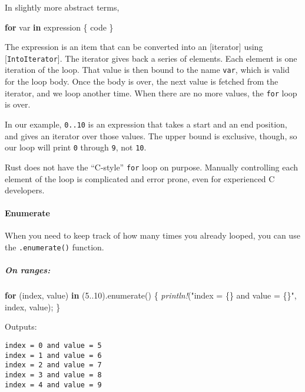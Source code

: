 \documentclass[a4paper,]{book}
\newenvironment{Shaded}{\begin{snugshade}}{\end{snugshade}}
\newcommand{\KeywordTok}[1]{\textcolor[rgb]{0.13,0.29,0.53}{\textbf{{#1}}}}
\newcommand{\DecValTok}[1]{\textcolor[rgb]{0.00,0.00,0.81}{{#1}}}
\newcommand{\StringTok}[1]{\textcolor[rgb]{0.31,0.60,0.02}{{#1}}}
\newcommand{\PreprocessorTok}[1]{\textcolor[rgb]{0.56,0.35,0.01}{\textit{{#1}}}}
\newcommand{\NormalTok}[1]{{#1}}
\let\oldparagraph\paragraph
\renewcommand{\paragraph}[1]{\oldparagraph{#1}\mbox{}}
\let\oldsubparagraph\subparagraph
\renewcommand{\subparagraph}[1]{\oldsubparagraph{#1}\mbox{}}
\begin{document}
In slightly more abstract terms,

\begin{Shaded}
\begin{Highlighting}[]
\KeywordTok{for} \NormalTok{var }\KeywordTok{in} \NormalTok{expression \{}
    \NormalTok{code}
\NormalTok{\}}
\end{Highlighting}
\end{Shaded}

The expression is an item that can be converted into an {[}iterator{]}
using {[}\texttt{IntoIterator}{]}. The iterator gives back a series of
elements. Each element is one iteration of the loop. That value is then
bound to the name \texttt{var}, which is valid for the loop body. Once
the body is over, the next value is fetched from the iterator, and we
loop another time. When there are no more values, the \texttt{for} loop
is over.

In our example, \texttt{0..10} is an expression that takes a start and
an end position, and gives an iterator over those values. The upper
bound is exclusive, though, so our loop will print \texttt{0} through
\texttt{9}, not \texttt{10}.

Rust does not have the ``C-style'' \texttt{for} loop on purpose.
Manually controlling each element of the loop is complicated and error
prone, even for experienced C developers.

\paragraph{Enumerate}\label{enumerate}

When you need to keep track of how many times you already looped, you
can use the \texttt{.enumerate()} function.

\subparagraph{On ranges:}\label{on-ranges}

\begin{Shaded}
\begin{Highlighting}[]
\KeywordTok{for} \NormalTok{(index, value) }\KeywordTok{in} \NormalTok{(}\DecValTok{5.}\NormalTok{.}\DecValTok{10}\NormalTok{).enumerate() \{}
    \PreprocessorTok{println!}\NormalTok{(}\StringTok{"index = \{\} and value = \{\}"}\NormalTok{, index, value);}
\NormalTok{\}}
\end{Highlighting}
\end{Shaded}

Outputs:

\begin{verbatim}
index = 0 and value = 5
index = 1 and value = 6
index = 2 and value = 7
index = 3 and value = 8
index = 4 and value = 9
\end{verbatim}
\end{document}

